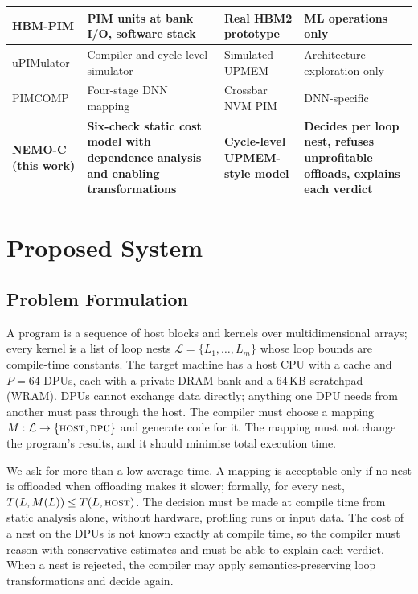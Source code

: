 \documentclass{ieeeaccess}
\begin{document}
\begin{table}[!t]
\begin{tabular}{|p{2.6cm}|p{4.2cm}|p{3.2cm}|p{6.6cm}|}
HBM-PIM \cite{lee2021hbmpim} & PIM units at bank I/O, software stack & Real HBM2 prototype & ML operations only \\ \hline
uPIMulator \cite{hyun2024pathfinding} & Compiler and cycle-level simulator & Simulated UPMEM & Architecture exploration only \\ \hline
PIMCOMP \cite{sun2023pimcomp} & Four-stage DNN mapping & Crossbar NVM PIM & DNN-specific \\ \hline
\textbf{NEMO-C (this work)} & \textbf{Six-check static cost model with dependence analysis and enabling transformations} & \textbf{Cycle-level UPMEM-style model} & \textbf{Decides per loop nest, refuses unprofitable offloads, explains each verdict} \\ \hline
\end{tabular}
\end{table}

\section{Proposed System}
\label{sec:proposed}

\subsection{Problem Formulation}
\label{sec:formulation}

A program is a sequence of host blocks and kernels over multidimensional arrays; every kernel is a list of loop nests $\mathcal{L}=\{L_1,\dots,L_m\}$ whose loop bounds are compile-time constants. The target machine has a host CPU with a cache and $P=64$ DPUs, each with a private DRAM bank and a 64\,KB scratchpad (WRAM). DPUs cannot exchange data directly; anything one DPU needs from another must pass through the host. The compiler must choose a mapping $M:\mathcal{L}\rightarrow\{\textsc{host},\textsc{dpu}\}$ and generate code for it. The mapping must not change the program's results, and it should minimise total execution time.

We ask for more than a low average time. A mapping is acceptable only if no nest is offloaded when offloading makes it slower; formally, for every nest, $T(L,M(L))\le T(L,\textsc{host})$. The decision must be made at compile time from static analysis alone, without hardware, profiling runs or input data. The cost of a nest on the DPUs is not known exactly at compile time, so the compiler must reason with conservative estimates and must be able to explain each verdict. When a nest is rejected, the compiler may apply semantics-preserving loop transformations and decide again.
\end{document}
